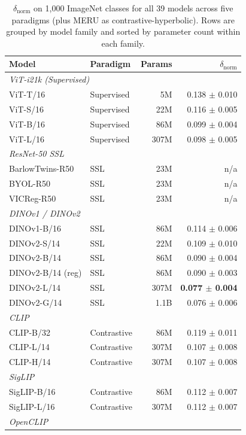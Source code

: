 \begin{table}[t]
\caption{$\delta_{\text{norm}}$ on 1{,}000 ImageNet classes for all 39 models across five paradigms (plus MERU as contrastive-hyperbolic). Rows are grouped by model family and sorted by parameter count within each family.}
\label{tab:models}
\centering\scriptsize
\begin{tabular}{llrr}
\toprule
Model & Paradigm & Params & $\delta_{\text{norm}}$ \\
\midrule
\multicolumn{4}{l}{\emph{ViT-i21k (Supervised)}} \\
ViT-T/16 & Supervised & 5M & 0.138 $\pm$ 0.010 \\
ViT-S/16 & Supervised & 22M & 0.116 $\pm$ 0.005 \\
ViT-B/16 & Supervised & 86M & 0.099 $\pm$ 0.004 \\
ViT-L/16 & Supervised & 307M & 0.098 $\pm$ 0.005 \\
\midrule
\multicolumn{4}{l}{\emph{ResNet-50 SSL}} \\
BarlowTwins-R50 & SSL & 23M & n/a \\
BYOL-R50 & SSL & 23M & n/a \\
VICReg-R50 & SSL & 23M & n/a \\
\midrule
\multicolumn{4}{l}{\emph{DINOv1 / DINOv2}} \\
DINOv1-B/16 & SSL & 86M & 0.114 $\pm$ 0.006 \\
DINOv2-S/14 & SSL & 22M & 0.109 $\pm$ 0.010 \\
DINOv2-B/14 & SSL & 86M & 0.090 $\pm$ 0.004 \\
DINOv2-B/14 (reg) & SSL & 86M & 0.090 $\pm$ 0.003 \\
DINOv2-L/14 & SSL & 307M & \textbf{0.077 $\pm$ 0.004} \\
DINOv2-G/14 & SSL & 1.1B & 0.076 $\pm$ 0.006 \\
\midrule
\multicolumn{4}{l}{\emph{CLIP}} \\
CLIP-B/32 & Contrastive & 86M & 0.119 $\pm$ 0.011 \\
CLIP-L/14 & Contrastive & 307M & 0.107 $\pm$ 0.008 \\
CLIP-H/14 & Contrastive & 307M & 0.107 $\pm$ 0.008 \\
\midrule
\multicolumn{4}{l}{\emph{SigLIP}} \\
SigLIP-B/16 & Contrastive & 86M & 0.112 $\pm$ 0.007 \\
SigLIP-L/16 & Contrastive & 307M & 0.112 $\pm$ 0.007 \\
\midrule
\multicolumn{4}{l}{\emph{OpenCLIP}} \\

\end{tabular}
\end{table}
